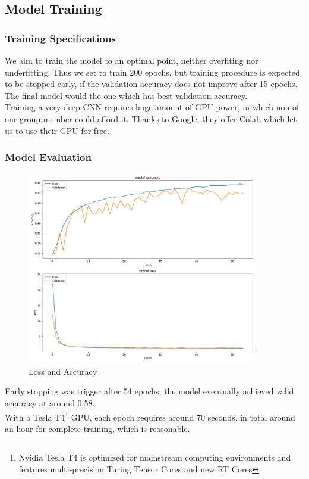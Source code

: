 \documentclass[11pt,a4paper]{article}
\begin{document}
    \subsection{Model Training}
    \subsubsection{Training Specifications}
    We aim to train the model to an optimal point, neither overfiting nor underfitting. Thus we set to train 200 epochs, but training procedure is expected to be stopped early, if the validation accuracy does not improve after 15 epochs. The final model would the one which has best validation accuracy. \\
    Training a very deep CNN requires huge amount of GPU power, in which non of our group member could afford it. Thanks to Google, they offer \href{https://research.google.com/colaboratory/}{Colab} which let us to use their GPU for free.
    
    \subsubsection{Model Evaluation}
    \begin{figure}[H]
        \centering
        \includegraphics[width = 0.9\textwidth]{emotion_detection/plot/history.pdf}
        \caption{Loss and Accuracy}
        \label{fig:loss_acc}
    \end{figure}
    Early stopping was trigger after 54 epochs, the model eventually achieved valid accuracy at around 0.58. \\
    With a \href{https://www.nvidia.com/en-us/data-center/tesla-t4/}{Tesla T4}\footnote{Nvidia Tesla T4 is optimized for mainstream computing environments and features multi-precision Turing Tensor Cores and new RT Cores} GPU, each epoch requires around 70 seconds, in total around an hour for complete training, which is reasonable.
    
\end{document}
